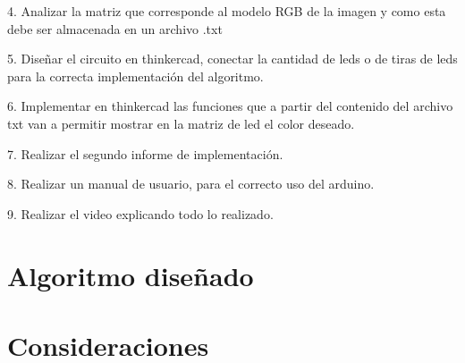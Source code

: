 \documentclass{article}
\begin{document}
4. Analizar la matriz que corresponde al modelo RGB de la imagen y como esta debe ser almacenada en un archivo .txt

5. Diseñar el circuito en thinkercad, conectar la cantidad de leds o de tiras de leds para la correcta implementación del algoritmo.

6. Implementar en thinkercad las funciones que a partir del contenido del archivo txt van a permitir mostrar en la matriz de led el color deseado.

7. Realizar el segundo informe de implementación.

8. Realizar un manual de usuario, para el correcto uso del arduino.

9. Realizar el video explicando todo lo realizado.


\section{Algoritmo diseñado}\label{Algoritmo}



\section{Consideraciones}\label{Consideraciones}
\end{document}

